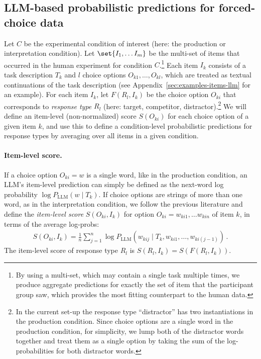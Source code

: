 \documentclass{article}
\begin{document}
\subsection{LLM-based probabilistic predictions for forced-choice data}
\label{sec:notat--term}

Let $C$ be the experimental condition of interest (here: the production or interpretation condition).
Let \(\set{I_1, \dots I_m}\) be the multi-set of items that occurred in the human experiment for condition $C$.\footnote{
  By using a multi-set, which may contain a single task multiple times, we produce aggregate predictions for exactly the set of item that the participant group saw, which provides the most fitting counterpart to the human data.
}
Each item $I_{k}$ consists of a task description $T_{k}$ and $l$ choice options $O_{k1}, \dots, O_{kl}$, which are treated as textual continuations of the task description (see Appendix~\ref{sec:examples-items-llm} for an example).
For each item $I_{k}$, let $F(R_{l}, I_{k})$ be the choice option $O_{ki}$ that corresponds to \emph{response type} $R_{l}$ (here: target, competitor, distractor).\footnote{In the current set-up the response type ``distractor'' has two instantiations in the production condition. Since choice options are a single word in the production condition, for simplicity, we lump both of the distractor words together and treat them as a single option by taking the sum of the log-probabilities for both distractor words.}
We will define an item-level (non-normalized) score $S(O_{ki})$ for each choice option of a given item $k$, and use this to define a condition-level probabilistic predictions for response types by averaging over all items in a given condition.

\paragraph{Item-level score.}
If a choice option $O_{ki} = w$ is a single word, like in the production condition, an LLM's item-level prediction can simply be defined as the next-word log probability $\log P_{\text{LLM}} (w \mid T_{k})$.
If choice options are strings of more than one word, as in the interpretation condition, we follow the previous literature \citep[e.g.,][]{BrownMann2020:Language-Models} and define the \emph{item-level score} $S(O_{{ki}}, I_{k})$ for option $O_{ki} = w_{ki1}, \dots w_{kin}$ of item $k$, in terms of the average log-probs:
%
\begin{align*}
S(O_{ki}, I_{k}) =  \frac{1}{n} \sum_{j=1}^n \log P_{\text{LLM}} \left(w_{kij} \mid T_{k}, w_{ki1}, \dots, w_{ki(j-1)} \right)  \,.
\end{align*}
%
The item-level score of response type $R_{l}$ is $S(R_{l}, I_{k}) = S(F(R_{l}, I_{k}))$.
\end{document}
